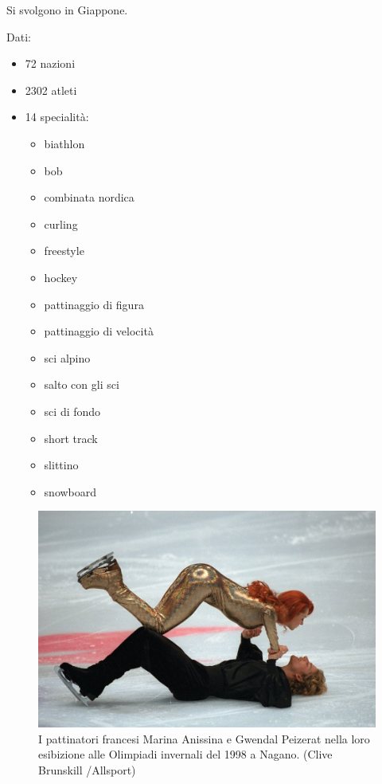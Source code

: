 \documentclass[
]{book}
\providecommand{\tightlist}{%
  \setlength{\itemsep}{0pt}\setlength{\parskip}{0pt}}
\begin{document}
Si svolgono in Giappone.

Dati:

\begin{itemize}
\tightlist
\item
  72 nazioni
\item
  2302 atleti
\item
  14 specialità:

  \begin{itemize}
  \tightlist
  \item
    biathlon
  \item
    bob
  \item
    combinata nordica
  \item
    curling
  \item
    freestyle
  \item
    hockey
  \item
    pattinaggio di figura
  \item
    pattinaggio di velocità
  \item
    sci alpino
  \item
    salto con gli sci
  \item
    sci di fondo
  \item
    short track
  \item
    slittino
  \item
    snowboard
  \end{itemize}
\end{itemize}

\begin{figure}
\includegraphics[width=0.8\linewidth]{images/IlPost/1998} \caption{I pattinatori francesi Marina Anissina e Gwendal Peizerat nella loro esibizione alle Olimpiadi invernali del 1998 a Nagano. (Clive Brunskill /Allsport)}\label{fig:unnamed-chunk-63}
\end{figure}
\end{document}
